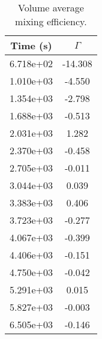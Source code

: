 \begin{table}[htbp]
	\centering
	\caption{Volume average mixing efficiency.}
	\begin{tabular}{cc}
	\toprule
	 Time (s) & $\Gamma$\\ 
	\midrule
	 6.718e+02 & -14.308 \\ 
	 1.010e+03 & -4.550 \\ 
	 1.354e+03 & -2.798 \\ 
	 1.688e+03 & -0.513 \\ 
	 2.031e+03 & 1.282 \\ 
	 2.370e+03 & -0.458 \\ 
	 2.705e+03 & -0.011 \\ 
	 3.044e+03 & 0.039 \\ 
	 3.383e+03 & 0.406 \\ 
	 3.723e+03 & -0.277 \\ 
	 4.067e+03 & -0.399 \\ 
	 4.406e+03 & -0.151 \\ 
	 4.750e+03 & -0.042 \\ 
	 5.291e+03 & 0.015 \\ 
	 5.827e+03 & -0.003 \\ 
	 6.505e+03 & -0.146 \\ 
	\bottomrule
	\end{tabular}
	\label{tab:mixing}
\end{table}